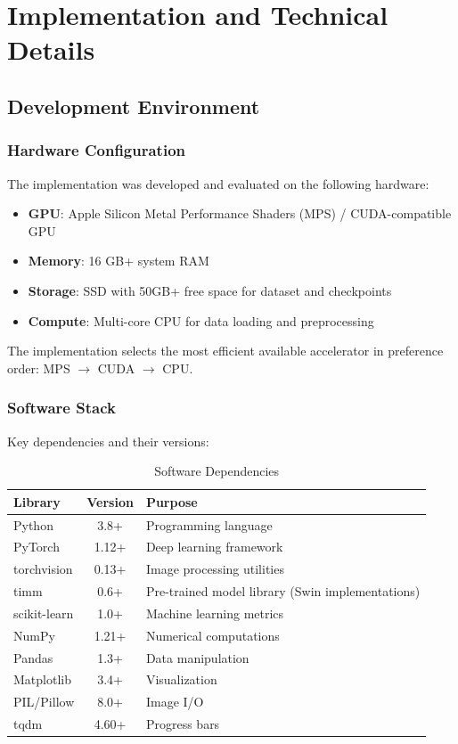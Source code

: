 \chapter{Implementation and Technical Details}
\label{ch:implementation}

\section{Development Environment}

\subsection{Hardware Configuration}

The implementation was developed and evaluated on the following hardware:

\begin{itemize}
    \item \textbf{GPU}: Apple Silicon Metal Performance Shaders (MPS) / CUDA-compatible GPU
    \item \textbf{Memory}: 16 GB+ system RAM
    \item \textbf{Storage}: SSD with 50GB+ free space for dataset and checkpoints
    \item \textbf{Compute}: Multi-core CPU for data loading and preprocessing
\end{itemize}

The implementation selects the most efficient available accelerator in preference order: MPS $\rightarrow$ CUDA $\rightarrow$ CPU.

\subsection{Software Stack}

Key dependencies and their versions:

\begin{table}[H]
\centering
\caption{Software Dependencies}
\label{tab:dependencies}
\begin{tabular}{|l|c|l|}
\hline
\textbf{Library} & \textbf{Version} & \textbf{Purpose} \\
\hline
Python & 3.8+ & Programming language \\
PyTorch & 1.12+ & Deep learning framework \\
torchvision & 0.13+ & Image processing utilities \\
timm & 0.6+ & Pre-trained model library (Swin implementations) \\
scikit-learn & 1.0+ & Machine learning metrics \\
NumPy & 1.21+ & Numerical computations \\
Pandas & 1.3+ & Data manipulation \\
Matplotlib & 3.4+ & Visualization \\
PIL/Pillow & 8.0+ & Image I/O \\
tqdm & 4.60+ & Progress bars \\
\hline
\end{tabular}
\end{table}

